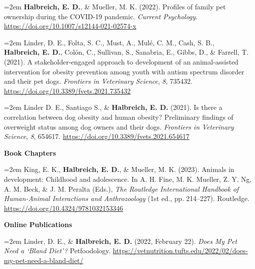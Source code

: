 \documentclass[letter,11pt]{article}
\begin{document}
\hangindent=2em
\textbf{Halbreich, E. D.}, \& Mueller, M. K. (2022). Profiles of family pet ownership during the COVID-19 pandemic. \textit{Current Psychology}. \href{https://doi.org/10.1007/s12144-021-02574-x}{https://doi.org/10.1007/s12144-021-02574-x}
\vspace{1mm}

\hangindent=2em
Linder, D. E., Folta, S. C., Must, A., Mulé, C. M., Cash, S. B., \textbf{Halbreich, E. D.}, Colón, C., Sullivan, S., Sanabria, E., Gibbs, D., \& Farrell, T. (2021). A stakeholder-engaged approach to development of an animal-assisted intervention for obesity prevention among youth with autism spectrum disorder and their pet dogs. \textit{Frontiers in Veterinary Science}, \textit{8}, 735432. \href{https://doi.org/10.3389/fvets.2021.735432}{https://doi.org/10.3389/fvets.2021.735432}
\vspace{1mm}

\hangindent=2em
Linder D. E., Santiago S., \& \textbf{Halbreich, E. D.} (2021). Is there a correlation between dog obesity and human obesity? Preliminary findings of overweight status among dog owners and their dogs. \textit{Frontiers in Veterinary Science}, \textit{8}, 654617. \href{https://doi.org/10.3389/fvets.2021.654617}{https://doi.org/10.3389/fvets.2021.654617}

\vspace{3mm}

\textbf{Book Chapters}
\vspace{0.2mm}

\hangindent=2em
King, E. K., \textbf{Halbreich, E. D.}, \& Mueller, M. K. (2023). Animals in development: Childhood and adolescence. In A. H. Fine, M. K. Mueller, Z. Y. Ng, A. M. Beck, \& J. M. Peralta  (Eds.), \textit{The Routledge International Handbook of Human-Animal Interactions and Anthrozoology} (1st ed., pp. 214--227). Routledge. \href{https://doi.org/10.4324/9781032153346}{https://doi.org/10.4324/9781032153346}
\vspace{3mm}

\textbf{Online Publications}
\vspace{0.2mm}

\hangindent=2em
Linder, D. E., \& \textbf{Halbreich, E. D.} (2022, February 22). \textit{Does My Pet Need a ‘Bland Diet’?} Petfoodology. \href{https://vetnutrition.tufts.edu/2022/02/does-my-pet-need-a-bland-diet/}{https://vetnutrition.tufts.edu/2022/02/does-my-pet-need-a-bland-diet/}
\vspace{1mm}
\end{document}
